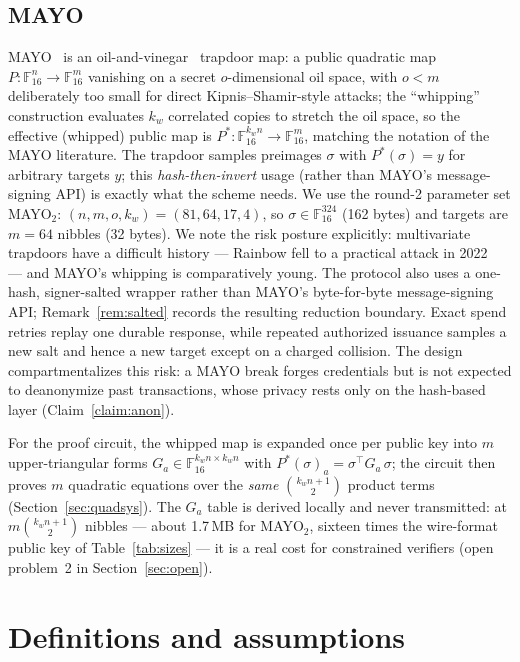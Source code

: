 \documentclass[11pt]{article}
\newcommand{\F}{\mathbb{F}}
\newcommand{\Fsixteen}{\F_{16}}
\begin{document}
\subsection{MAYO}
\label{sec:mayo}

MAYO~\cite{Beullens21,MAYOspec} is an oil-and-vinegar~\cite{UOV} trapdoor
map: a public quadratic map $P : \Fsixteen^{n} \to \Fsixteen^{m}$
vanishing on a secret $o$-dimensional oil space, with $o < m$ deliberately
too small for direct Kipnis--Shamir-style attacks; the ``whipping''
construction evaluates $k_w$ correlated copies to stretch the oil space, so
the effective (whipped) public map is
$P^\ast : \Fsixteen^{k_w n} \to \Fsixteen^{m}$, matching the notation of the
MAYO literature. The trapdoor samples preimages
$\sigma$ with $P^\ast(\sigma) = y$ for arbitrary targets $y$; this
\emph{hash-then-invert} usage (rather than MAYO's message-signing API) is
exactly what the scheme needs. We use the round-2 parameter set
MAYO$_2$: $(n,m,o,k_w) = (81,64,17,4)$, so $\sigma \in \Fsixteen^{324}$
(162 bytes) and targets are $m = 64$ nibbles (32 bytes). We note the risk
posture explicitly: multivariate trapdoors have a difficult history ---
Rainbow fell to a practical attack in 2022~\cite{Beullens22} --- and MAYO's
whipping is comparatively young. The protocol also uses a one-hash,
signer-salted wrapper rather than MAYO's byte-for-byte message-signing API;
Remark~\ref{rem:salted} records the resulting reduction boundary. Exact spend
retries replay one durable response, while repeated authorized issuance
samples a new salt and hence a new target except on a charged collision. The
design compartmentalizes this risk:
a MAYO break forges credentials but is not expected to deanonymize past
transactions, whose privacy rests only on the hash-based layer
(Claim~\ref{claim:anon}).

For the proof circuit, the whipped map is expanded once per public key into
$m$ upper-triangular forms $G_a \in \Fsixteen^{k_w n \times k_w n}$ with
$P^\ast(\sigma)_a = \sigma^{\!\top} G_a\, \sigma$; the circuit then proves
$m$ quadratic equations over the \emph{same} $\binom{k_w n + 1}{2}$ product
terms (Section~\ref{sec:quadsys}). The $G_a$ table is derived locally and
never transmitted: at $m \binom{k_w n + 1}{2}$ nibbles --- about
1.7\,MB for MAYO$_2$, sixteen times the wire-format public key of
Table~\ref{tab:sizes} --- it is a real cost for constrained verifiers
(open problem~2 in Section~\ref{sec:open}).

\section{Definitions and assumptions}
\label{sec:definitions}
\end{document}
